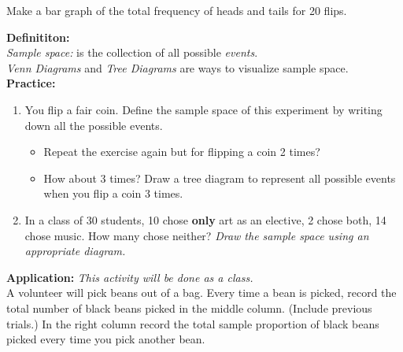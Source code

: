 \documentclass[12pt]{article}
\begin{document}
Make a bar graph of the total frequency of heads and tails for 20 flips. \\
\vspace{10em}

\textbf{Definititon:}\\

\textit{Sample space:}  is the collection of all possible \textit{events}. \\

\textit{Venn Diagrams} and \textit{ Tree Diagrams} are ways to visualize sample space.
\\

\textbf{Practice:}

\begin{enumerate}
\item You flip a fair coin. Define the sample space of this experiment by writing down all the possible events.\\

\begin{itemize}
 \item Repeat the exercise again but for flipping a coin 2 times?\\
 \vspace{2em}
 
 \item How about 3 times? Draw a tree diagram to represent all possible events when you flip a coin 3 times.\\
\vspace{7em}

  \end{itemize}
  
\item In a class of 30 students, 10 chose \textbf{only} art as an elective, 2 chose both, 14 chose music. How many chose neither?
\textit{Draw the sample space using an appropriate diagram.}\\ 
\vspace{5em}

 \end{enumerate}

\clearpage

\textbf{Application:} \textit{This activity will be done as a class.} \\ [12pt]

A volunteer will pick beans out of a bag. Every time a bean is picked, record the total number of black beans picked in the middle column. (Include previous trials.) In the right column record the total sample proportion of black beans picked every time you pick another bean. \\
\end{document}
